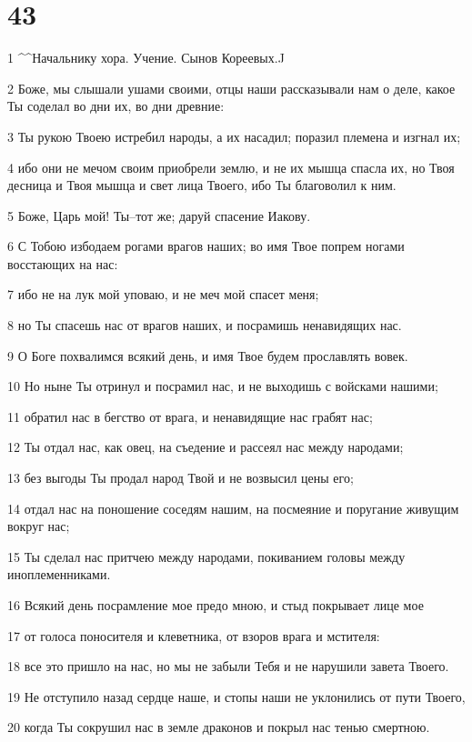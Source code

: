 \chapter{43}

\par 1 ^^Начальнику хора. Учение. Сынов Кореевых.^^
\par 2 Боже, мы слышали ушами своими, отцы наши рассказывали нам о деле, какое Ты соделал во дни их, во дни древние:
\par 3 Ты рукою Твоею истребил народы, а их насадил; поразил племена и изгнал их;
\par 4 ибо они не мечом своим приобрели землю, и не их мышца спасла их, но Твоя десница и Твоя мышца и свет лица Твоего, ибо Ты благоволил к ним.
\par 5 Боже, Царь мой! Ты--тот же; даруй спасение Иакову.
\par 6 С Тобою избодаем рогами врагов наших; во имя Твое попрем ногами восстающих на нас:
\par 7 ибо не на лук мой уповаю, и не меч мой спасет меня;
\par 8 но Ты спасешь нас от врагов наших, и посрамишь ненавидящих нас.
\par 9 О Боге похвалимся всякий день, и имя Твое будем прославлять вовек.
\par 10 Но ныне Ты отринул и посрамил нас, и не выходишь с войсками нашими;
\par 11 обратил нас в бегство от врага, и ненавидящие нас грабят нас;
\par 12 Ты отдал нас, как овец, на съедение и рассеял нас между народами;
\par 13 без выгоды Ты продал народ Твой и не возвысил цены его;
\par 14 отдал нас на поношение соседям нашим, на посмеяние и поругание живущим вокруг нас;
\par 15 Ты сделал нас притчею между народами, покиванием головы между иноплеменниками.
\par 16 Всякий день посрамление мое предо мною, и стыд покрывает лице мое
\par 17 от голоса поносителя и клеветника, от взоров врага и мстителя:
\par 18 все это пришло на нас, но мы не забыли Тебя и не нарушили завета Твоего.
\par 19 Не отступило назад сердце наше, и стопы наши не уклонились от пути Твоего,
\par 20 когда Ты сокрушил нас в земле драконов и покрыл нас тенью смертною.
